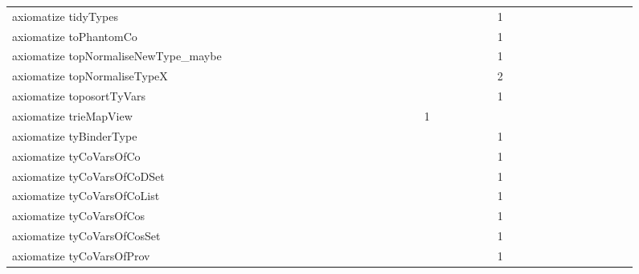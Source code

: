 {\begin{tabular}{l|rrr|rrr|rrr}
axiomatize tidyTypes &  &  &  &  &  &  &  &  &  &  &  &  &  &  &  &  &  &  &  &  &  &  &  & 1 &  &  &  &  &  &  &  &  &  &  &  & \\
axiomatize toPhantomCo &  &  &  &  &  &  &  &  &  &  &  &  &  &  &  &  &  &  &  &  &  &  &  & 1 &  &  &  &  &  &  &  &  &  &  &  & \\
axiomatize topNormaliseNewType_maybe &  &  &  &  &  &  &  &  &  &  &  &  &  &  &  &  &  &  &  &  &  &  &  & 1 &  &  &  &  &  &  &  &  &  &  &  & \\
axiomatize topNormaliseTypeX &  &  &  &  &  &  &  &  &  &  &  &  &  &  &  &  &  &  &  &  &  &  &  & 2 &  &  &  &  &  &  &  &  &  &  &  & \\
axiomatize toposortTyVars &  &  &  &  &  &  &  &  &  &  &  &  &  &  &  &  &  &  &  &  &  &  &  & 1 &  &  &  &  &  &  &  &  &  &  &  & \\
axiomatize trieMapView &  &  &  &  &  &  &  &  &  &  &  &  &  &  &  &  &  & 1 &  &  &  &  &  &  &  &  &  &  &  &  &  &  &  &  &  & \\
axiomatize tyBinderType &  &  &  &  &  &  &  &  &  &  &  &  &  &  &  &  &  &  &  &  &  &  &  & 1 &  &  &  &  &  &  &  &  &  &  &  & \\
axiomatize tyCoVarsOfCo &  &  &  &  &  &  &  &  &  &  &  &  &  &  &  &  &  &  &  &  &  &  &  & 1 &  &  &  &  &  &  &  &  &  &  &  & \\
axiomatize tyCoVarsOfCoDSet &  &  &  &  &  &  &  &  &  &  &  &  &  &  &  &  &  &  &  &  &  &  &  & 1 &  &  &  &  &  &  &  &  &  &  &  & \\
axiomatize tyCoVarsOfCoList &  &  &  &  &  &  &  &  &  &  &  &  &  &  &  &  &  &  &  &  &  &  &  & 1 &  &  &  &  &  &  &  &  &  &  &  & \\
axiomatize tyCoVarsOfCos &  &  &  &  &  &  &  &  &  &  &  &  &  &  &  &  &  &  &  &  &  &  &  & 1 &  &  &  &  &  &  &  &  &  &  &  & \\
axiomatize tyCoVarsOfCosSet &  &  &  &  &  &  &  &  &  &  &  &  &  &  &  &  &  &  &  &  &  &  &  & 1 &  &  &  &  &  &  &  &  &  &  &  & \\
axiomatize tyCoVarsOfProv &  &  &  &  &  &  &  &  &  &  &  &  &  &  &  &  &  &  &  &  &  &  &  & 1 &  &  &  &  &  &  &  &  &  &  &  & \\

\end{tabular}}
